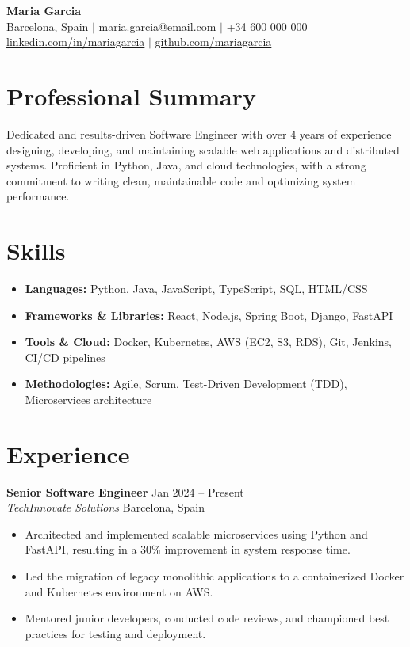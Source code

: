 \documentclass[a4paper,10pt]{article}
\begin{document}
\pagestyle{empty}

\begin{center}
    \textbf{\Huge Maria Garcia} \\
    \vspace{0.5ex}
    Barcelona, Spain $|$ \href{mailto:maria.garcia@email.com}{maria.garcia@email.com} $|$ +34 600 000 000 \\
    \href{https://linkedin.com/in/mariagarcia}{linkedin.com/in/mariagarcia} $|$ \href{https://github.com/mariagarcia}{github.com/mariagarcia}
\end{center}

\section*{Professional Summary}
Dedicated and results-driven Software Engineer with over 4 years of experience designing, developing, and maintaining scalable web applications and distributed systems. Proficient in Python, Java, and cloud technologies, with a strong commitment to writing clean, maintainable code and optimizing system performance.

\section*{Skills}
\begin{itemize}[leftmargin=0.15in, label={}]
    \item \textbf{Languages:} Python, Java, JavaScript, TypeScript, SQL, HTML/CSS
    \item \textbf{Frameworks \& Libraries:} React, Node.js, Spring Boot, Django, FastAPI
    \item \textbf{Tools \& Cloud:} Docker, Kubernetes, AWS (EC2, S3, RDS), Git, Jenkins, CI/CD pipelines
    \item \textbf{Methodologies:} Agile, Scrum, Test-Driven Development (TDD), Microservices architecture
\end{itemize}

\section*{Experience}
\noindent
\textbf{Senior Software Engineer} \hfill Jan 2024 -- Present \\
\textit{TechInnovate Solutions} \hfill Barcelona, Spain
\begin{itemize}[leftmargin=0.25in]
    \item Architected and implemented scalable microservices using Python and FastAPI, resulting in a 30\% improvement in system response time.
    \item Led the migration of legacy monolithic applications to a containerized Docker and Kubernetes environment on AWS.
    \item Mentored junior developers, conducted code reviews, and championed best practices for testing and deployment.
\end{itemize}
\end{document}
